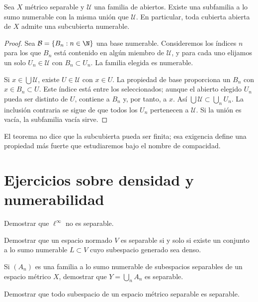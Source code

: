 \begin{teorema}[Lindelöf]\label{ch06:lindelof}
Sea $X$ métrico separable y $\mathcal U$ una familia de abiertos. Existe una subfamilia a lo sumo numerable con la misma unión que $\mathcal U$. En particular, toda cubierta abierta de $X$ admite una subcubierta numerable.
\end{teorema}
\begin{proof}
Sea $\mathcal B=\{B_n:n\in\N\}$ una base numerable. Consideremos los índices $n$ para los que $B_n$ está contenido en algún miembro de $\mathcal U$, y para cada uno elijamos un solo $U_n\in\mathcal U$ con $B_n\subset U_n$. La familia elegida es numerable.

Si $x\in\bigcup\mathcal U$, existe $U\in\mathcal U$ con $x\in U$. La propiedad de base proporciona un $B_n$ con $x\in B_n\subset U$. Este índice está entre los seleccionados; aunque el abierto elegido $U_n$ pueda ser distinto de $U$, contiene a $B_n$ y, por tanto, a $x$. Así $\bigcup\mathcal U\subset\bigcup_nU_n$. La inclusión contraria se sigue de que todos los $U_n$ pertenecen a $\mathcal U$. Si la unión es vacía, la subfamilia vacía sirve.
\end{proof}
El teorema no dice que la subcubierta pueda ser finita; esa exigencia define una propiedad más fuerte que estudiaremos bajo el nombre de compacidad.

\section{Ejercicios sobre densidad y numerabilidad}
\begin{ejercicio}\label{ej:lectura-6-1}
Demostrar que $\ell^\infty$ no es separable.
\end{ejercicio}


\begin{ejercicio}\label{ej:lectura-6-2}
Demostrar que un espacio normado $V$ es separable si y solo si existe un conjunto a lo sumo numerable $L\subset V$ cuyo subespacio generado sea denso.
\end{ejercicio}


\begin{ejercicio}\label{ej:lectura-6-3}
Si $(A_n)$ es una familia a lo sumo numerable de subespacios separables de un espacio métrico $X$, demostrar que $Y=\bigcup_nA_n$ es separable.
\end{ejercicio}


\begin{ejercicio}\label{ej:lectura-6-4}
Demostrar que todo subespacio de un espacio métrico separable es separable.
\end{ejercicio}


